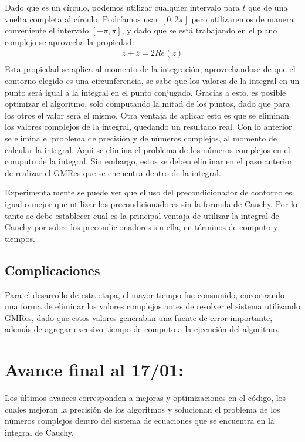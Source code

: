 \documentclass[fleqn]{article}
\begin{document}
Dado que es un círculo, podemos utilizar cualquier intervalo para $t$ que de una vuelta completa al círculo. Podríamos usar $[0, 2\pi]$ pero utilizaremos de manera conveniente el intervalo $[-\pi,\pi]$, y dado que se está trabajando en el plano complejo se aprovecha la propiedad:
\begin{align}
    z + \overline{z} = 2Re(z)\\
\end{align}
Esta propiedad se aplica al momento de la integración, aprovechandose de que el contorno elegido es una circunferencia, se sabe que los valores de la integral en un punto será igual a la integral en el punto conjugado. Gracias a esto, es posible optimizar el algoritmo, solo computando la mitad de los puntos, dado que para los otros el valor será el mismo.
Otra ventaja de aplicar esto es que se eliminan los valores complejos de la integral, quedando un resultado real. Con lo anterior se elimina el problema de precisión y de números complejos, al momento de calcular la integral. Aqui se elimina el problema de los números complejos en el computo de la integral. Sin embargo, estos se deben eliminar en el paso anterior de realizar el GMRes que se encuentra dentro de la integral.

Experimentalmente se puede ver que el uso del precondicionador de contorno es igual o mejor que utilizar los precondicionadores sin la formula de Cauchy. Por lo tanto se debe establecer cual es la principal ventaja de utilizar la integral de Cauchy por sobre los precondicionadores sin ella, en términos de computo y tiempos.
\newpage

\subsection*{Complicaciones}
Para el desarrollo de esta etapa, el mayor tiempo fue consumido, encontrando una forma de eliminar los valores complejos antes de resolver el sistema utilizando GMRes, dado que estos valores generaban una fuente de error importante, además de agregar excesivo tiempo de computo a la ejecución del algoritmo.


\section{Avance final al 17/01:}

Los últimos avances corresponden a mejoras y optimizaciones en el código, los cuales mejoran la precisión de los algoritmos y solucionan el problema de los números complejos dentro del sistema de ecuaciones que se encuentra en la integral de Cauchy.
\end{document}
